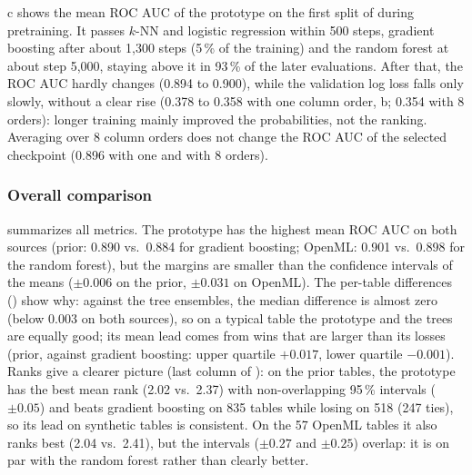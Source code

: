 c shows the mean ROC AUC of the prototype on
the first split of \tabpfnval{} during pretraining. It passes $k$-NN and
logistic regression within 500 steps, gradient boosting after about
1{,}300 steps (5\,\% of the training) and the random forest at about step
5{,}000, staying above it in 93\,\% of the later evaluations. After that,
the ROC AUC hardly changes (0.894 to 0.900), while the validation log loss
falls only slowly, without a clear rise (0.378 to 0.358 with one column order,
b; 0.354 with 8 orders):
longer training mainly improved the probabilities, not the ranking.
Averaging over 8 column orders does not change the ROC AUC of the selected
checkpoint (0.896 with one and with 8 orders).

\subsubsection{Overall comparison}\label{sec:overall}

 summarizes all metrics. The prototype has the highest
mean ROC AUC on both sources (prior: 0.890 vs.\ 0.884 for gradient boosting;
OpenML: 0.901 vs.\ 0.898 for the random forest), but the margins are smaller
than the confidence intervals of the means ($\pm 0.006$ on the prior,
$\pm 0.031$ on OpenML). The per-table differences
() show why: against the tree ensembles, the
median difference is almost zero (below 0.003 on both sources), so on a
typical table the prototype and the trees are equally good; its mean lead
comes from wins that are larger than its losses (prior, against gradient
boosting: upper quartile $+0.017$, lower quartile $-0.001$). Ranks give a
clearer picture (last column of ):
on the prior tables, the prototype has the best mean rank (2.02 vs.\ 2.37)
with non-overlapping 95\,\% intervals ($\pm 0.05$) and beats gradient boosting on 835 tables
while losing on 518 (247 ties), so its lead on synthetic tables is consistent. On the
57 OpenML tables it also ranks best (2.04 vs.\ 2.41), but the intervals
($\pm 0.27$ and $\pm 0.25$) overlap: it is on par with the random forest rather than clearly better.

\begin{table}[!ht]
  \centering
  \small
  \setlength{\tabcolsep}{4pt}  %
  
  \caption{Mean scores per model on the prior and the OpenML tables (splits
    averaged first). Rank: mean rank by ROC AUC, 1 = best on a table. Best
    value per source in bold; $\uparrow$: higher is better, $\downarrow$:
    lower is better.}
  \label{tab:results}
\end{table}

